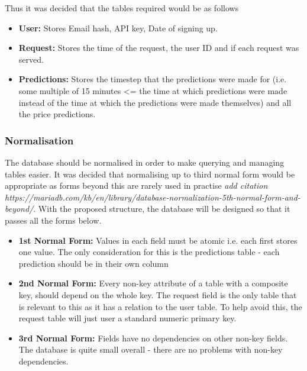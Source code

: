         Thus it was decided that the tables required would be as follows
        \begin{itemize}

            \item \textbf{User:} Stores Email hash, API key, Date of signing up. 

            \item \textbf{Request:} Stores the time of the request, the user ID and if each request was served.
            
            \item \textbf{Predictions:} Stores the timestep that the predictions were made for (i.e. some multiple of 15 minutes <= the time at which predictions were made instead of the time at which the predictions were made themselves) and all the price predictions.
            
        \end{itemize}
        
            \subsubsection{Normalisation}
            The database should be normalised in order to make querying and managing tables easier. It was decided that normalising up to third normal form would be appropriate as forms beyond this are rarely used in practise \textit{add citation https://mariadb.com/kb/en/library/database-normalization-5th-normal-form-and-beyond/}. With the proposed structure, the database will be designed so that it passes all the forms below.

            \begin{itemize}

                \item \textbf{1st Normal Form:} Values in each field must be atomic i.e. each first stores one value. The only consideration for this is the predictions table - each prediction should be in their own column
                
                \item \textbf{2nd Normal Form:} Every non-key attribute of a table with a composite key, should depend on the whole key. The request field is the only table that is relevant to this as it has a relation to the user table. To help avoid this, the request table will just user a standard numeric primary key.
                
                \item \textbf{3rd Normal Form:} Fields have no dependencies on other non-key fields. The database is quite small overall - there are no problems with non-key dependencies. 
            
            \end{itemize}

